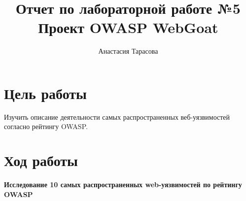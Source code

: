 \documentclass[10pt,a4paper]{article}
\author{Анастасия Тарасова}
\title{Отчет по лабораторной работе №5\\ Проект OWASP WebGoat}
\begin{document}
\maketitle
\section{Цель работы}
Изучить описание деятельности самых распространенных веб-уязвимостей согласно рейтингу OWASP.
\section{Ход работы}

\paragraph{Исследование 10 самых распространенных web-уязвимостей по рейтингу OWASP} 
\end{document}
